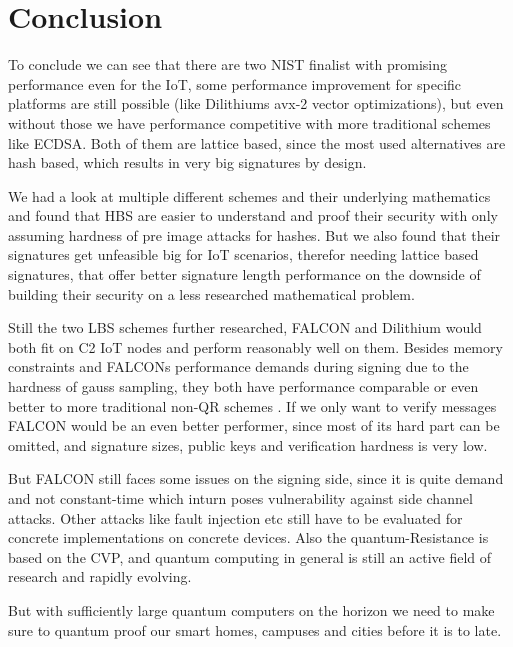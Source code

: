 \documentclass[conference]{IEEEtran}
\newcommand{\comment}[1]{}
\begin{document}

\section{Conclusion}
\comment{ %
- of course no protection against side channel etc 
- quantum fast evolving, active field of research
- smart home, smart campus, smart city
- quantum key distribution
\cite{QR_comparison}

- similar performance as traditional and also implemented in TSL variant \cite{falcon_and_dilithium}

Dilithium when signing and verification often needed
Falcon if only very since hard part is gaussian smapling which can be omitted on ver
} %

To conclude we can see that there are two NIST finalist with promising performance even for the IoT, some performance improvement for specific platforms are still possible (like Dilithiums avx-2 vector optimizations), but even without those we have performance competitive with more traditional schemes like ECDSA.
Both of them are lattice based, since the most used alternatives are hash based, which results in very big signatures by design.

We had a look at multiple different schemes and their underlying mathematics and found that HBS are easier to understand and proof their security with only assuming hardness of pre image attacks for hashes. But we also found that their signatures get unfeasible big for IoT scenarios, therefor needing lattice based signatures, that offer better signature length performance on the downside of building their security on a less researched mathematical problem.

Still the two LBS schemes further researched, FALCON and Dilithium would both fit on C2 IoT nodes and perform reasonably well on them.
Besides memory constraints and FALCONs performance demands during signing due to the hardness of gauss sampling, they both have performance comparable or even better to more traditional non-QR schemes \cite{falcon_and_dilithium}. If we only want to verify messages FALCON would be an even better performer, since most of its hard part can be omitted, and signature sizes, public keys and verification hardness is very low.

But FALCON still faces some issues on the signing side, since it is quite demand and not constant-time which inturn poses vulnerability against side channel attacks.
Other attacks like fault injection etc still have to be evaluated for concrete implementations on concrete devices.
Also the quantum-Resistance is based on the CVP, and quantum computing in general is still an active field of research and rapidly evolving.

But with sufficiently large quantum computers on the horizon we need to make sure to quantum proof our smart homes, campuses and cities before it is to late.



\end{document}
